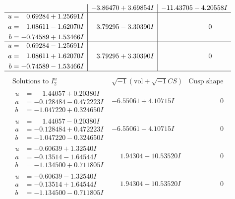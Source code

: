 \documentclass[1p]{elsarticle_modified}
\theoremstyle{definition}
\newcommand{\I}{\sqrt{-1}}
\begin{document}
$$\begin{array}{c|c|c}
 & -3.86470 + 3.69854 I & -11.43705 - 4.20558 I \\ \hline\begin{aligned}
u &= \phantom{-}0.69284 + 1.25691 I \\
a &= \phantom{-}1.08611 - 1.62070 I \\
b &= -0.74589 + 1.53466 I\end{aligned}
 & \phantom{-}3.79295 - 3.30390 I & \phantom{-0.000000 } 0 \\ \hline\begin{aligned}
u &= \phantom{-}0.69284 - 1.25691 I \\
a &= \phantom{-}1.08611 + 1.62070 I \\
b &= -0.74589 - 1.53466 I\end{aligned}
 & \phantom{-}3.79295 + 3.30390 I & \phantom{-0.000000 } 0\\
 \hline 
 \end{array}$$\newpage$$\begin{array}{c|c|c}  
\text{Solutions to }I^u_{2}& \I (\text{vol} + \sqrt{-1}CS) & \text{Cusp shape}\\
 \hline 
\begin{aligned}
u &= \phantom{-}1.44057 + 0.20380 I \\
a &= -0.128484 - 0.472223 I \\
b &= -1.047220 + 0.324650 I\end{aligned}
 & -6.55061 + 4.10715 I & \phantom{-0.000000 } 0 \\ \hline\begin{aligned}
u &= \phantom{-}1.44057 - 0.20380 I \\
a &= -0.128484 + 0.472223 I \\
b &= -1.047220 - 0.324650 I\end{aligned}
 & -6.55061 - 4.10715 I & \phantom{-0.000000 } 0 \\ \hline\begin{aligned}
u &= -0.60639 + 1.32540 I \\
a &= -0.13514 - 1.64544 I \\
b &= -1.134500 + 0.711805 I\end{aligned}
 & \phantom{-}1.94304 + 10.53520 I & \phantom{-0.000000 } 0 \\ \hline\begin{aligned}
u &= -0.60639 - 1.32540 I \\
a &= -0.13514 + 1.64544 I \\
b &= -1.134500 - 0.711805 I\end{aligned}
 & \phantom{-}1.94304 - 10.53520 I & \phantom{-0.000000 } 0 \\ \hline\begin{aligned}

\end{aligned}
\end{array}$$
\end{document}

